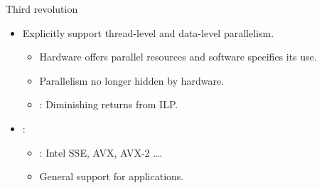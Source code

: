\begin{frame}[t]{Third revolution}
\begin{itemize}
  \item Explicitly support thread-level and data-level parallelism.
    \begin{itemize}
      \item Hardware offers parallel resources and software specifies its use.
      \item Parallelism no longer hidden by hardware.
      \item {}: Diminishing returns from ILP.
    \end{itemize}
  \item {}:
    \begin{itemize}
      \item {}: Intel SSE, AVX, AVX-2 \ldots.
      \item General support for  applications.
    \end{itemize}
\end{itemize}
\end{frame}

